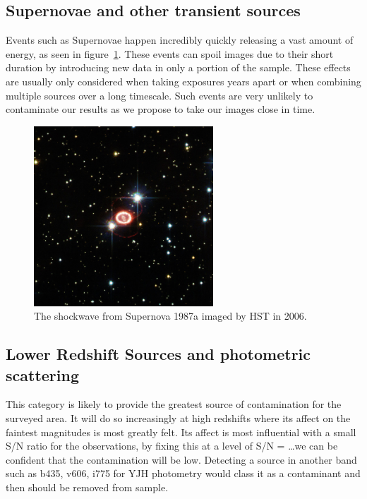     \subsection{Supernovae and other transient sources} %
    \label{sub:supernovae_and_other_transient_sources}
        Events such as Supernovae happen incredibly quickly releasing a vast amount of energy, as seen in figure~\ref{fig:SNe_1987a}. These events can spoil images due to their short duration by introducing new data in only a portion of the sample. These effects are usually only considered when taking exposures years apart or when combining multiple sources over a long timescale. Such events are very unlikely to contaminate our results as we propose to take our images close in time.
        \begin{figure}[ht]
            \centering
            \includegraphics[width=0.6\textwidth]{../Images/SNe_1987a.jpg}
            \caption{The shockwave from Supernova 1987a imaged by HST in 2006.\label{fig:SNe_1987a}}
        \end{figure}

    \subsection{Lower Redshift Sources and photometric scattering} %
    \label{sub:lower_redshift_sources_and_photometric_scattering}
        This category is likely to provide the greatest source of contamination for the surveyed area. It will do so increasingly at high redshifts where its affect on the faintest magnitudes is most greatly felt. Its affect is most influential with a small S/N ratio for the observations, by fixing this at a level of S/N = \ldots we can be confident that the contamination will be low. Detecting a source in another band such as b435, v606, i775 for YJH photometry would class it as a contaminant and then should be removed from sample.


